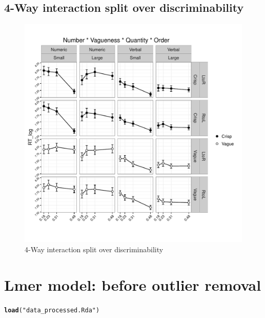 \documentclass[a4paper,12pt,twoside]{article}\usepackage[]{graphicx}\usepackage[]{color}
\makeatletter
\def\maxwidth{ %
  \ifdim\Gin@nat@width>\linewidth
    \linewidth
  \else
    \Gin@nat@width
  \fi
}
\newcommand{\hlstr}[1]{\textcolor[rgb]{0.192,0.494,0.8}{#1}}%
\newcommand{\hlstd}[1]{\textcolor[rgb]{0.345,0.345,0.345}{#1}}%
\newcommand{\hlkwd}[1]{\textcolor[rgb]{0.737,0.353,0.396}{\textbf{#1}}}%
\newenvironment{kframe}{%
 \def\at@end@of@kframe{}%
 \ifinner\ifhmode%
  \def\at@end@of@kframe{\end{minipage}}%
  \begin{minipage}{\columnwidth}%
 \fi\fi%
 \def\FrameCommand##1{\hskip\@totalleftmargin \hskip-\fboxsep
 \colorbox{shadecolor}{##1}\hskip-\fboxsep
     \hskip-\linewidth \hskip-\@totalleftmargin \hskip\columnwidth}%
 \MakeFramed {\advance\hsize-\width
   \@totalleftmargin\z@ \linewidth\hsize
   \@setminipage}}%
 {\par\unskip\endMakeFramed%
 \at@end@of@kframe}
\newenvironment{knitrout}{}{} %
\makeatother
\begin{document}
\clearpage
\subsection{4-Way interaction split over discriminability}


\begin{knitrout}\scriptsize
{}\color{fgcolor}\begin{figure}[hbtp]

{\centering \includegraphics[width=\maxwidth]{figure/graphics-4waysplit-1} 

}

\caption[4-Way interaction split over discriminability]{4-Way interaction split over discriminability}\label{fig:4waysplit}
\end{figure}


\end{knitrout}

\clearpage
\section{Lmer model: before outlier removal}

\begin{knitrout}\scriptsize
{}\color{fgcolor}\begin{kframe}
\begin{alltt}
\hlkwd{load}\hlstd{(}\hlstr{"data_processed.Rda"}\hlstd{)}
\end{alltt}
\end{kframe}
\end{knitrout}
\end{document}
